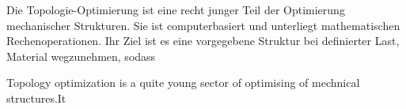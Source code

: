 
Die Topologie-Optimierung ist eine recht junger Teil der Optimierung mechanischer Strukturen. Sie ist computerbasiert und unterliegt mathematischen Rechenoperationen. Ihr Ziel ist es eine vorgegebene Struktur bei definierter Last, Material wegzunehmen, sodass 

Topology optimization is a quite young sector of optimising of mechnical structures.It 

